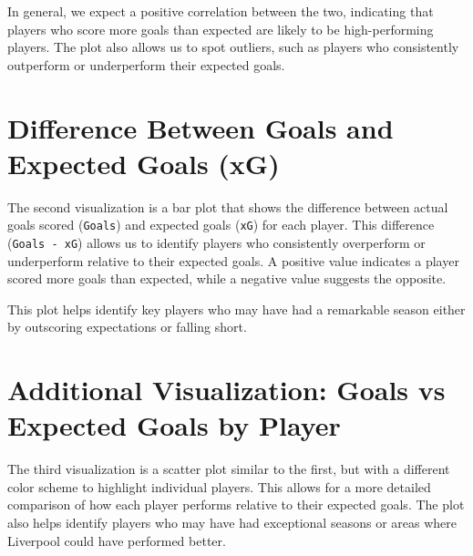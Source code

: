 \documentclass{article}
\begin{document}
In general, we expect a positive correlation between the two, indicating that players who score more goals than expected are likely to be high-performing players. The plot also allows us to spot outliers, such as players who consistently outperform or underperform their expected goals.

\section{Difference Between Goals and Expected Goals (xG)}

The second visualization is a bar plot that shows the difference between actual goals scored (\texttt{Goals}) and expected goals (\texttt{xG}) for each player. This difference (\texttt{Goals - xG}) allows us to identify players who consistently overperform or underperform relative to their expected goals. A positive value indicates a player scored more goals than expected, while a negative value suggests the opposite.

This plot helps identify key players who may have had a remarkable season either by outscoring expectations or falling short. 


\section{Additional Visualization: Goals vs Expected Goals by Player}

The third visualization is a scatter plot similar to the first, but with a different color scheme to highlight individual players. This allows for a more detailed comparison of how each player performs relative to their expected goals. The plot also helps identify players who may have had exceptional seasons or areas where Liverpool could have performed better.
\end{document}
